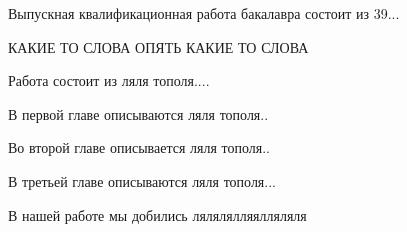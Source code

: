 Выпускная квалификационная работа бакалавра состоит из 39...

\noindent КАКИЕ ТО СЛОВА \linebreak ОПЯТЬ КАКИЕ ТО СЛОВА

Работа состоит из ляля тополя....

В первой главе описываются ляля тополя..

Во второй главе описывается ляля тополя..

В третьей главе описываются ляля тополя...

В нашей работе мы добились лялялялляялляляля